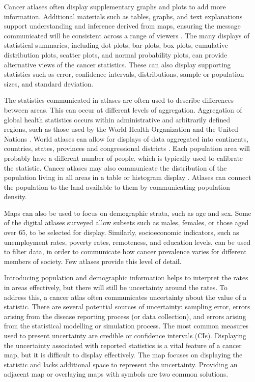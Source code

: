 \documentclass{monashthesis}
\begin{document}
Cancer atlases often display supplementary graphs and plots to add more information. Additional materials such as tables, graphs, and text explanations support understanding and inference derived from maps, ensuring the message communicated will be consistent across a range of viewers \autocite{CPISACA}. The many displays of statistical summaries, including dot plots, bar plots, box plots, cumulative distribution plots, scatter plots, and normal probability plots, can provide alternative views of the cancer statistics. These can also display supporting statistics such as error, confidence intervals, distributions, sample or population sizes, and standard deviation.

The statistics communicated in atlases are often used to describe differences between areas. This can occur at different levels of aggregation. Aggregation of global health statistics occurs within administrative and arbitrarily defined regions, such as those used by the World Health Organization and the United Nations \autocite{IARC_3}. World atlases can allow for displays of data aggregated into continents, countries, states, provinces and congressional districts \autocite{USInteractive}. Each population area will probably have a different number of people, which is typically used to calibrate the statistic. Cancer atlases may also communicate the distribution of the population living in all areas in a table or histogram display \autocite{NICR_1}. Atlases can connect the population to the land available to them by communicating population density.

Maps can also be used to focus on demographic strata, such as age and sex. Some of the digital atlases surveyed allow subsets such as males, females, or those aged over 65, to be selected for display. Similarly, socioeconomic indicators, such as unemployment rates, poverty rates, remoteness, and education levels, can be used to filter data, in order to communicate how cancer prevalence varies for different members of society. Few atlases provide this level of detail.

Introducing population and demographic information helps to interpret the rates in areas effectively, but there will still be uncertainty around the rates. To address this, a cancer atlas often communicates uncertainty about the value of a statistic. There are several potential sources of uncertainty: sampling error, errors arising from the disease reporting process (or data collection), and errors arising from the statistical modelling or simulation process. The most common measures used to present uncertainty are credible or confidence intervals (CIs). Displaying the uncertainty associated with reported statistics is a vital feature of a cancer map, but it is difficult to display effectively. The map focuses on displaying the statistic and lacks additional space to represent the uncertainty. Providing an adjacent map or overlaying maps with symbols \autocite{VSSDCUC} are two common solutions.
\end{document}
